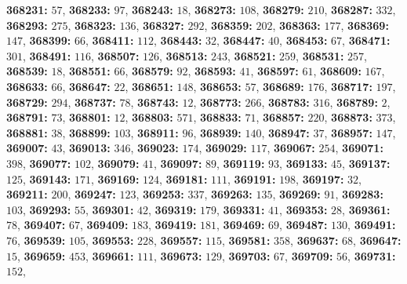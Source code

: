 \textsf{\bfseries 368231:} $57$, \textsf{\bfseries 368233:} $97$, \textsf{\bfseries 368243:} $18$, \textsf{\bfseries 368273:} $108$, \textsf{\bfseries 368279:} $210$, \textsf{\bfseries 368287:} $332$, \textsf{\bfseries 368293:} $275$, \textsf{\bfseries 368323:} $136$, \textsf{\bfseries 368327:} $292$, \textsf{\bfseries 368359:} $202$, \textsf{\bfseries 368363:} $177$, \textsf{\bfseries 368369:} $147$, \textsf{\bfseries 368399:} $66$, \textsf{\bfseries 368411:} $112$, \textsf{\bfseries 368443:} $32$, \textsf{\bfseries 368447:} $40$, \textsf{\bfseries 368453:} $67$, \textsf{\bfseries 368471:} $301$, \textsf{\bfseries 368491:} $116$, \textsf{\bfseries 368507:} $126$, \textsf{\bfseries 368513:} $243$, \textsf{\bfseries 368521:} $259$, \textsf{\bfseries 368531:} $257$, \textsf{\bfseries 368539:} $18$, \textsf{\bfseries 368551:} $66$, \textsf{\bfseries 368579:} $92$, \textsf{\bfseries 368593:} $41$, \textsf{\bfseries 368597:} $61$, \textsf{\bfseries 368609:} $167$, \textsf{\bfseries 368633:} $66$, \textsf{\bfseries 368647:} $22$, \textsf{\bfseries 368651:} $148$, \textsf{\bfseries 368653:} $57$, \textsf{\bfseries 368689:} $176$, \textsf{\bfseries 368717:} $197$, \textsf{\bfseries 368729:} $294$, \textsf{\bfseries 368737:} $78$, \textsf{\bfseries 368743:} $12$, \textsf{\bfseries 368773:} $266$, \textsf{\bfseries 368783:} $316$, \textsf{\bfseries 368789:} $2$, \textsf{\bfseries 368791:} $73$, \textsf{\bfseries 368801:} $12$, \textsf{\bfseries 368803:} $571$, \textsf{\bfseries 368833:} $71$, \textsf{\bfseries 368857:} $220$, \textsf{\bfseries 368873:} $373$, \textsf{\bfseries 368881:} $38$, \textsf{\bfseries 368899:} $103$, \textsf{\bfseries 368911:} $96$, \textsf{\bfseries 368939:} $140$, \textsf{\bfseries 368947:} $37$, \textsf{\bfseries 368957:} $147$, \textsf{\bfseries 369007:} $43$, \textsf{\bfseries 369013:} $346$, \textsf{\bfseries 369023:} $174$, \textsf{\bfseries 369029:} $117$, \textsf{\bfseries 369067:} $254$, \textsf{\bfseries 369071:} $398$, \textsf{\bfseries 369077:} $102$, \textsf{\bfseries 369079:} $41$, \textsf{\bfseries 369097:} $89$, \textsf{\bfseries 369119:} $93$, \textsf{\bfseries 369133:} $45$, \textsf{\bfseries 369137:} $125$, \textsf{\bfseries 369143:} $171$, \textsf{\bfseries 369169:} $124$, \textsf{\bfseries 369181:} $111$, \textsf{\bfseries 369191:} $198$, \textsf{\bfseries 369197:} $32$, \textsf{\bfseries 369211:} $200$, \textsf{\bfseries 369247:} $123$, \textsf{\bfseries 369253:} $337$, \textsf{\bfseries 369263:} $135$, \textsf{\bfseries 369269:} $91$, \textsf{\bfseries 369283:} $103$, \textsf{\bfseries 369293:} $55$, \textsf{\bfseries 369301:} $42$, \textsf{\bfseries 369319:} $179$, \textsf{\bfseries 369331:} $41$, \textsf{\bfseries 369353:} $28$, \textsf{\bfseries 369361:} $78$, \textsf{\bfseries 369407:} $67$, \textsf{\bfseries 369409:} $183$, \textsf{\bfseries 369419:} $181$, \textsf{\bfseries 369469:} $69$, \textsf{\bfseries 369487:} $130$, \textsf{\bfseries 369491:} $76$, \textsf{\bfseries 369539:} $105$, \textsf{\bfseries 369553:} $228$, \textsf{\bfseries 369557:} $115$, \textsf{\bfseries 369581:} $358$, \textsf{\bfseries 369637:} $68$, \textsf{\bfseries 369647:} $15$, \textsf{\bfseries 369659:} $453$, \textsf{\bfseries 369661:} $111$, \textsf{\bfseries 369673:} $129$, \textsf{\bfseries 369703:} $67$, \textsf{\bfseries 369709:} $56$, \textsf{\bfseries 369731:} $152$, 

